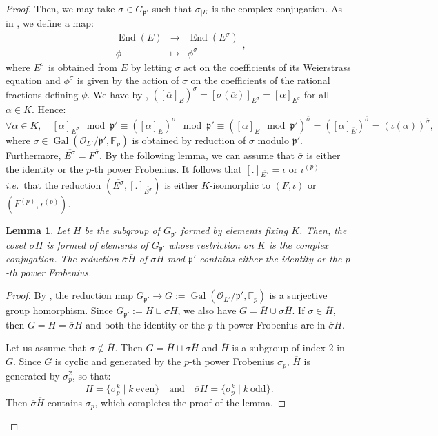 \documentclass[a4paper,10pt]{report}
\theoremstyle{definition}
\theoremstyle{plain}
\newtheorem{Lemma}[Definition]{Lemma}
\theoremstyle{definition}
\newcommand{\ie}{\emph{i.e.}\ }
\newcommand{\F}{\mathbb{F}}
\newcommand{\mO}{\mathcal{O}}
\renewcommand{\(}{\left(}
\renewcommand{\)}{\right)}
\newcommand{\mfp}{\mathfrak{p}}
\DeclareMathOperator{\End}{End}
\DeclareMathOperator{\Gal}{Gal}
\begin{document}
\begin{proof}
Then, we may take $\sigma\in G_{\mfp'}$ such that $\sigma_{|K}$ is the complex conjugation. As in \cite[§ II.2]{Silverman2}, we define a map:
\[\begin{array}{rcl}\End(E)&\longrightarrow&\End(E^{\sigma})\\
\phi &\longmapsto &\phi^\sigma
\end{array},\]
where $E^{\sigma}$ is obtained from $E$ by letting $\sigma$ act on the coefficients of its Weierstrass equation and $\phi^\sigma$ is given by the action of $\sigma$ on the coefficients of the rational fractions defining $\phi$. We have by \cite[Theorem II.2.2.(a)]{Silverman2}, $([\overline{\alpha}]_E)^\sigma=[\sigma(\overline{\alpha})]_{E^\sigma}=[\alpha]_{E^\sigma}$ for all $\alpha\in K$.  Hence:
\[\forall\alpha\in K, \quad [\alpha]_{E^\sigma} \mod\mfp'\equiv ([\overline{\alpha}]_E)^\sigma \mod\mfp'\equiv \([\overline{\alpha}]_E \mod\mfp'\)^{\overline{\sigma}}= ([\overline{\alpha}]_{\overline{E}})^{\overline{\sigma}}= (\iota(\alpha))^{\overline{\sigma}},\]
where $\overline{\sigma}\in\Gal(\mO_{L'}/\mfp',\F_p)$ is obtained by reduction of $\sigma$ modulo $\mfp'$. Furthermore, $\overline{E^{\sigma}}=F^{\overline{\sigma}}$. By the following lemma, we can assume that $\overline{\sigma}$ is either the identity or the $p$-th power Frobenius. It follows that $[.]_{\overline{E^{\sigma}}}=\iota$ or $\iota^{(p)}$ \ie that the reduction $(\overline{E^{\sigma}},[.]_{\overline{E^{\sigma}}})$ is either $K$-isomorphic to $(F,\iota)$ or $(F^{(p)},\iota^{(p)})$.

\begin{Lemma}
Let $H$ be the subgroup of $G_{\mfp'}$ formed by elements fixing $K$. Then, the coset $\sigma H$ is formed of elements of $G_{\mfp'}$ whose restriction on $K$ is the complex conjugation. The reduction $\overline{\sigma}\overline{H}$ of $\sigma H$ mod $\mfp'$ contains either the identity or the $p$-th power Frobenius.
\end{Lemma}

\begin{proof}
By \cite[propostion I.14]{Lang_ANT}, the reduction map $G_{\mfp'}\longrightarrow G:=\Gal(\mO_{L'}/\mfp',\F_p)$ is a surjective group homorphism.  Since $G_{\mfp'}:=H\sqcup\sigma H$, we also have $G=\overline{H}\cup\overline{\sigma}\overline{H}$. If $\overline{\sigma}\in \overline{H}$, then $G=\overline{H}=\overline{\sigma}\overline{H}$ and both the identity or the $p$-th power Frobenius are in $\overline{\sigma}\overline{H}$.

Let us assume that $\overline{\sigma}\not\in \overline{H}$. Then $G=\overline{H}\sqcup\overline{\sigma}\overline{H}$ and $\overline{H}$ is a subgroup of index $2$ in $G$. Since $G$ is cyclic and generated by the $p$-th power Frobenius $\sigma_p$, $\overline{H}$ is generated by $\sigma_p^2$, so that:
\[\overline{H}=\{\sigma_p^k\mid k \ \mbox{even}\} \quad \mbox{and} \quad \overline{\sigma}\overline{H}=\{\sigma_p^k\mid k \ \mbox{odd}\}.\]
Then $\overline{\sigma}\overline{H}$ contains $\sigma_p$, which completes the proof of the lemma. 
\end{proof}


\end{proof}
\end{document}
